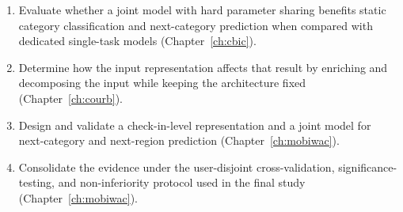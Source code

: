 \begin{enumerate}
    \item Evaluate whether a joint model with hard parameter sharing benefits static
    category classification and next-category prediction when compared with
    dedicated single-task models (Chapter~\ref{ch:cbic}).
    \item Determine how the input representation affects that result by enriching and
    decomposing the input while keeping the architecture fixed
    (Chapter~\ref{ch:courb}).
    \item Design and validate a check-in-level representation and a joint model for
    next-category and next-region prediction (Chapter~\ref{ch:mobiwac}).
    \item Consolidate the evidence under the user-disjoint cross-validation,
    significance-testing, and non-inferiority protocol used in the final study
    (Chapter~\ref{ch:mobiwac}).
\end{enumerate}




